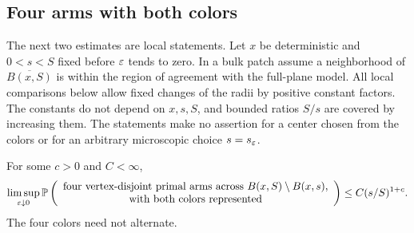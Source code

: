 \subsection{Four arms with both colors}

The next two estimates are local statements.  Let $x$ be deterministic and
$0<s<S$ fixed before $\varepsilon$ tends to zero.  In a bulk patch assume a
neighborhood of $\overline{B(x,S)}$ is within the region of agreement with
the full-plane model.  All local comparisons below allow fixed changes
of the radii by positive constant factors.  The constants do not depend
on $x,s,S$, and bounded ratios $S/s$ are covered by increasing them.  The
statements make no assertion for a center chosen from the colors or for
an arbitrary microscopic choice $s=s_\varepsilon$.

\begin{lemma}\label{lemma:mixed-four}
For some $c>0$ and $C<\infty$,
\begin{equation}\label{prob:mixed-four}
 \limsup_{\varepsilon\downarrow0}
 \mathbb P\left(\begin{array}{c}
 \text{four vertex-disjoint primal arms across }B(x,S)\setminus B(x,s),\\
 \text{with both colors represented}
 \end{array}\right)
 \le C(s/S)^{1+c}.
\end{equation}
The four colors need not alternate.
\end{lemma}

